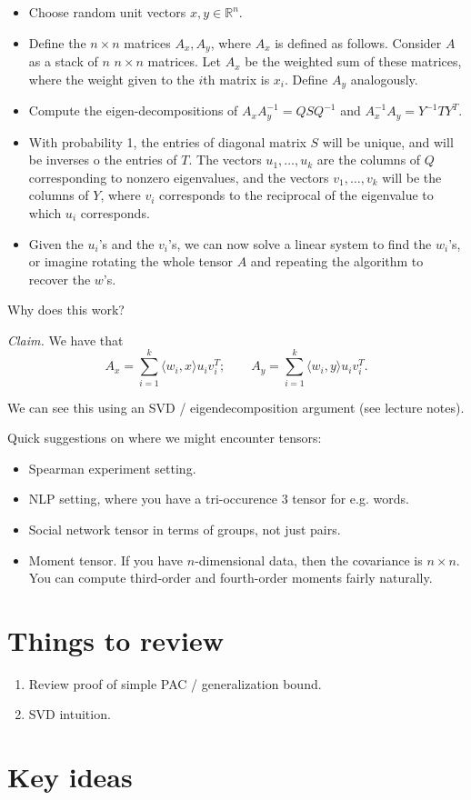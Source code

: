 \documentclass[12pt]{article}
\newcommand{\RR}{\mathbb{R}}
\begin{document}
\begin{itemize}
  \item Choose random unit vectors $x, y \in \RR^n$.
  \item Define the $n \times n$ matrices $A_x, A_y$, where $A_x$ is defined as follows.  Consider $A$ as a stack of $n$ $n \times n$ matrices.  Let $A_x$ be the weighted sum of these matrices, where the weight given to the $i$th matrix is $x_i$.  Define $A_y$ analogously.
  \item Compute the eigen-decompositions of $A_x A_y^{-1} = QSQ^{-1}$ and $A_{x}^{-1} A_y = Y^{-1} T Y^T$.
  \item With probability 1, the entries of diagonal matrix $S$ will be unique, and will be inverses o the entries of $T$.  The vectors $u_1, \dots, u_k$ are the columns of $Q$ corresponding to nonzero eigenvalues, and the vectors $v_1, \dots, v_k$ will be the columns of $Y$, where $v_i$ corresponds to the reciprocal of the eigenvalue to which $u_i$ corresponds.

  \item Given the $u_i$'s and the $v_i$'s, we can now solve a linear system to find the $w_i$'s, or imagine rotating the whole tensor $A$ and repeating the algorithm to recover the $w$'s.
\end{itemize}

Why does this work?

{\it Claim.} We have that
\[
  A_x = \sum_{i=1}^{k} \langle w_i, x \rangle u_i v_i^T; \qquad A_y = \sum_{i=1}^{k} \langle w_i, y \rangle u_i v_i^T.
\]

We can see this using an SVD / eigendecomposition argument (see lecture notes).

Quick suggestions on where we might encounter tensors:

\begin{itemize}
  \item Spearman experiment setting.
  \item NLP setting, where you have a tri-occurence 3 tensor for e.g. words.
  \item Social network tensor in terms of groups, not just pairs.
  \item Moment tensor.  If you have $n$-dimensional data, then the covariance is $n \times n$.  You can compute third-order and fourth-order moments fairly naturally.
\end{itemize}

\section{Things to review}

\begin{enumerate}
  \item Review proof of simple PAC / generalization bound.
  \item SVD intuition.
\end{enumerate}


\section{Key ideas}
\end{document}
